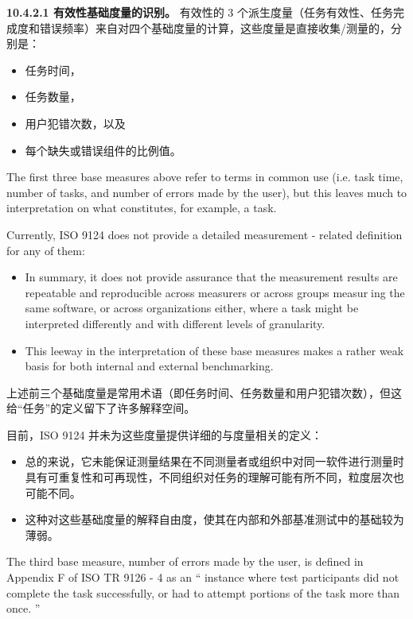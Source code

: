 \textbf{10.4.2.1 有效性基础度量的识别。} 有效性的 3 个派生度量（任务有效性、任务完成度和错误频率）来自对四个基础度量的计算，这些度量是直接收集/测量的，分别是：

\begin{itemize}
\item 任务时间，
\item 任务数量，
\item 用户犯错次数，以及
\item 每个缺失或错误组件的比例值。
\end{itemize}

The first three base measures above refer to terms in common use (i.e. task time, 
number of tasks, and number of errors made by the user), but this leaves much 
to interpretation on what constitutes, for example, a task.

Currently, ISO 9124 does not provide a detailed measurement - related definition for any of them:

\begin{itemize}
\item In summary, it does not provide assurance that the measurement results 
are repeatable and reproducible across measurers or across groups measur￾ing the same software, or across organizations either, where a task might 
be interpreted differently and with different levels of granularity. 
\item This leeway in the interpretation of these base measures makes a rather 
weak basis for both internal and external benchmarking.
\end{itemize}

上述前三个基础度量是常用术语（即任务时间、任务数量和用户犯错次数），但这给“任务”的定义留下了许多解释空间。

目前，ISO 9124 并未为这些度量提供详细的与度量相关的定义：

\begin{itemize}
  \item 总的来说，它未能保证测量结果在不同测量者或组织中对同一软件进行测量时具有可重复性和可再现性，不同组织对任务的理解可能有所不同，粒度层次也可能不同。
  \item 这种对这些基础度量的解释自由度，使其在内部和外部基准测试中的基础较为薄弱。
\end{itemize}
  
The third base measure, number of errors made by the user, is defined in 
Appendix F of ISO TR 9126 - 4 as an “ instance where test participants did not 
complete the task successfully, or had to attempt portions of the task more than 
once. ”

